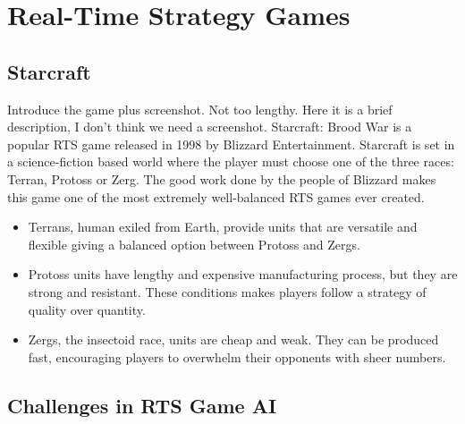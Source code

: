 \documentclass[journal]{IEEEtran}
\begin{document}
\section{Real-Time Strategy Games}\label{sec:rts}

\subsection{Starcraft}\label{subsec:starcraft}

{\color{blue}
Introduce the game plus screenshot. Not too lengthy.
}
{\color{ForestGreen}
Here it is a brief description, I don't think we need a screenshot.
}
Starcraft: Brood War is a popular RTS game released in 1998 by Blizzard Entertainment. Starcraft is set in a science-fiction based world where the player must choose one of the three races: Terran, Protoss or Zerg. The good work done by the people of Blizzard makes this game one of the most extremely well-balanced RTS games ever created.
\begin{itemize}
	\item Terrans, human exiled from Earth, provide units that are versatile and flexible giving a balanced option between Protoss and Zergs.
	\item Protoss units have lengthy and expensive manufacturing process, but they are strong and resistant. These conditions makes players follow a strategy of quality over quantity.
	\item Zergs, the insectoid race, units are cheap and weak. They can be produced fast, encouraging players to overwhelm their opponents with sheer numbers.
\end{itemize}

\subsection{Challenges in RTS Game AI}\label{subsec:challenges}
\end{document}
